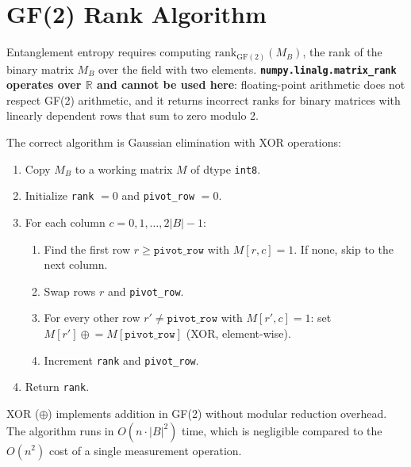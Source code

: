 \documentclass[twocolumn,prl,aps,floatfix]{revtex4-2}
\begin{document}
\section{GF(2) Rank Algorithm}
\label{app:gf2}

Entanglement entropy requires computing $\mathrm{rank}_{\mathrm{GF}(2)}(M_B)$,
the rank of the binary matrix $M_B$ over the field with two elements.
\textbf{\texttt{numpy.linalg.matrix\_rank} operates over $\mathbb{R}$ and cannot be
used here}: floating-point arithmetic does not respect GF(2) arithmetic,
and it returns incorrect ranks for binary matrices with linearly dependent rows
that sum to zero modulo 2.

The correct algorithm is Gaussian elimination with XOR operations:

\begin{enumerate}
  \item Copy $M_B$ to a working matrix $M$ of dtype \texttt{int8}.
  \item Initialize \texttt{rank} $= 0$ and \texttt{pivot\_row} $= 0$.
  \item For each column $c = 0, 1, \ldots, 2|B|-1$:
    \begin{enumerate}
      \item Find the first row $r \geq \texttt{pivot\_row}$ with $M[r,c] = 1$.
            If none, skip to the next column.
      \item Swap rows $r$ and \texttt{pivot\_row}.
      \item For every other row $r' \neq \texttt{pivot\_row}$ with $M[r',c]=1$:
            set $M[r'] \mathrel{\oplus}= M[\texttt{pivot\_row}]$ (XOR, element-wise).
      \item Increment \texttt{rank} and \texttt{pivot\_row}.
    \end{enumerate}
  \item Return \texttt{rank}.
\end{enumerate}

XOR ($\oplus$) implements addition in GF(2) without modular reduction overhead.
The algorithm runs in $O(n \cdot |B|^2)$ time, which is negligible compared to the
$O(n^2)$ cost of a single measurement operation.

\clearpage


\end{document}
